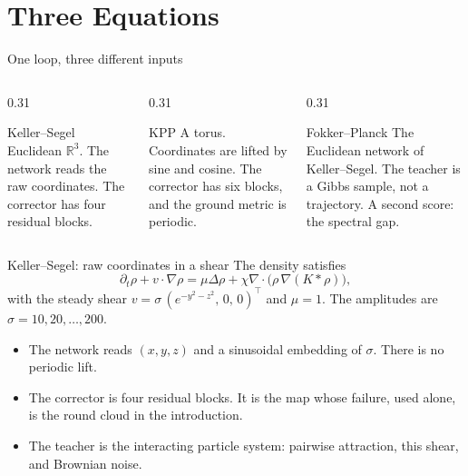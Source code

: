 \documentclass[aspectratio=169,11pt,t]{beamer}
\newcommand{\sectime}{}
\begin{document}
\renewcommand{\sectime}{About fourteen minutes}
\section[Equations]{Three Equations}

\begin{frame}{One loop, three different inputs}
  \begin{columns}[T,onlytextwidth]
    \begin{column}{0.31\textwidth}
      \begin{block}{Keller--Segel}
        Euclidean $\mathbb{R}^3$.
        The network reads the raw coordinates.
        The corrector has four residual blocks.
      \end{block}
    \end{column}
    \hfill
    \begin{column}{0.31\textwidth}
      \begin{block}{KPP}
        A torus.
        Coordinates are lifted by sine and cosine.
        The corrector has six blocks, and the ground metric is periodic.
      \end{block}
    \end{column}
    \hfill
    \begin{column}{0.31\textwidth}
      \begin{block}{Fokker--Planck}
        The Euclidean network of Keller--Segel.
        The teacher is a Gibbs sample, not a trajectory.
        A second score: the spectral gap.
      \end{block}
    \end{column}
  \end{columns}
\end{frame}

\begin{frame}{Keller--Segel: raw coordinates in a shear}
  The density satisfies
  \[
    \partial_t\rho+v\cdot\nabla\rho
    =\mu\Delta\rho+\chi\nabla\cdot\big(\rho\,\nabla(K*\rho)\big),
  \]
  with the steady shear
  \(
    v=\sigma\,(e^{-y^2-z^2},\,0,\,0)^\top
  \)
  and $\mu=1$.
  The amplitudes are $\sigma=10,20,\ldots,200$.
  \vspace{0.4em}
  \begin{itemize}
    \item The network reads $(x,y,z)$ and a sinusoidal embedding of $\sigma$. There is no periodic lift.
    \item The corrector is four residual blocks. It is the map whose failure, used alone, is the round cloud in the introduction.
    \item The teacher is the interacting particle system: pairwise attraction, this shear, and Brownian noise.
  \end{itemize}
\end{frame}
\end{document}
